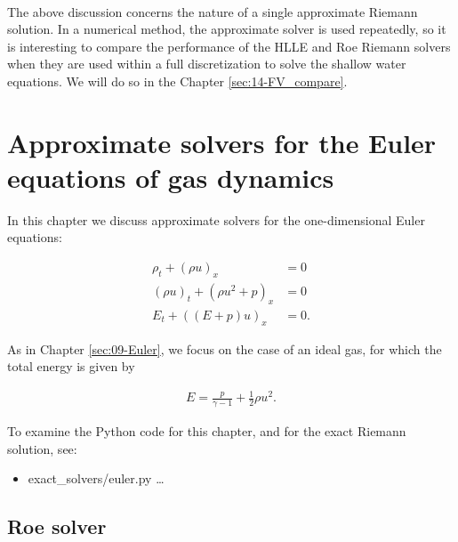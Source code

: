 \documentclass{SIAMbook2016}
\providecommand{\tightlist}{%
      \setlength{\itemsep}{0pt}\setlength{\parskip}{0pt}}
\begin{document}
    \begin{center}
    \end{center}
    { \hspace*{\fill} \\}
    
The above discussion concerns the nature of a single approximate Riemann
solution. In a numerical method, the approximate solver is used
repeatedly, so it is interesting to compare the performance of the HLLE
and Roe Riemann solvers when they are used within a full discretization
to solve the shallow water equations. We will do so in the
Chapter \ref{sec:14-FV_compare}.

\hypertarget{approximate-solvers-for-the-euler-equations-of-gas-dynamics}{%
\chapter{Approximate solvers for the Euler equations of gas
dynamics}\label{approximate-solvers-for-the-euler-equations-of-gas-dynamics}}
\label{sec:13-Euler_approximate}
In this chapter we discuss approximate solvers for the one-dimensional
Euler equations:

\begin{align}
    \rho_t + (\rho u)_x & = 0 \\
    (\rho u)_t + (\rho u^2 + p)_x & = 0 \\
    E_t + ((E+p)u)_x & = 0.
\end{align}

As in Chapter \ref{sec:09-Euler}, we focus on the case of an ideal gas,
for which the total energy is given by

\begin{align} \label{EA:EOS}
    E = \frac{p}{\gamma-1} + \frac{1}{2}\rho u^2.
\end{align}

To examine the Python code for this chapter, and for the exact Riemann
solution, see:

\begin{itemize}
\tightlist
\item
  {exact\_solvers/euler.py} \ldots{}
\end{itemize}

\hypertarget{roe-solver}{%
\section{Roe solver}\label{roe-solver}}
\end{document}
